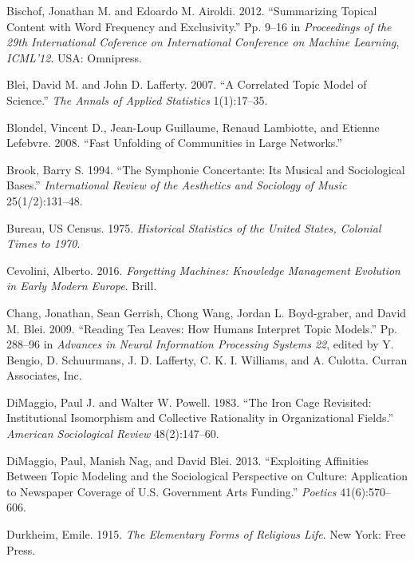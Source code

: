 \documentclass[]{book}
\theoremstyle{definition}
\theoremstyle{definition}
\theoremstyle{definition}
\theoremstyle{remark}
\begin{document}
\leavevmode\hypertarget{ref-Bischof2012Summarizing}{}%
Bischof, Jonathan M. and Edoardo M. Airoldi. 2012. ``Summarizing Topical
Content with Word Frequency and Exclusivity.'' Pp. 9--16 in
\emph{Proceedings of the 29th International Coference on International
Conference on Machine Learning}, \emph{ICML'12}. USA: Omnipress.

\leavevmode\hypertarget{ref-Blei2007correlated}{}%
Blei, David M. and John D. Lafferty. 2007. ``A Correlated Topic Model of
Science.'' \emph{The Annals of Applied Statistics} 1(1):17--35.

\leavevmode\hypertarget{ref-Blondel2008Fast}{}%
Blondel, Vincent D., Jean-Loup Guillaume, Renaud Lambiotte, and Etienne
Lefebvre. 2008. ``Fast Unfolding of Communities in Large Networks.''

\leavevmode\hypertarget{ref-Brook1994Symphonie}{}%
Brook, Barry S. 1994. ``The Symphonie Concertante: Its Musical and
Sociological Bases.'' \emph{International Review of the Aesthetics and
Sociology of Music} 25(1/2):131--48.

\leavevmode\hypertarget{ref-Bureau1975Historical}{}%
Bureau, US Census. 1975. \emph{Historical Statistics of the United
States, Colonial Times to 1970}.

\leavevmode\hypertarget{ref-Cevolini2016Forgetting}{}%
Cevolini, Alberto. 2016. \emph{Forgetting Machines: Knowledge Management
Evolution in Early Modern Europe}. Brill.

\leavevmode\hypertarget{ref-Chang2009Reading}{}%
Chang, Jonathan, Sean Gerrish, Chong Wang, Jordan L. Boyd-graber, and
David M. Blei. 2009. ``Reading Tea Leaves: How Humans Interpret Topic
Models.'' Pp. 288--96 in \emph{Advances in Neural Information Processing
Systems 22}, edited by Y. Bengio, D. Schuurmans, J. D. Lafferty, C. K.
I. Williams, and A. Culotta. Curran Associates, Inc.

\leavevmode\hypertarget{ref-DiMaggio1983Iron}{}%
DiMaggio, Paul J. and Walter W. Powell. 1983. ``The Iron Cage Revisited:
Institutional Isomorphism and Collective Rationality in Organizational
Fields.'' \emph{American Sociological Review} 48(2):147--60.

\leavevmode\hypertarget{ref-DiMaggio2013Exploiting}{}%
DiMaggio, Paul, Manish Nag, and David Blei. 2013. ``Exploiting
Affinities Between Topic Modeling and the Sociological Perspective on
Culture: Application to Newspaper Coverage of U.S. Government Arts
Funding.'' \emph{Poetics} 41(6):570--606.

\leavevmode\hypertarget{ref-Durkheim1915Elementary}{}%
Durkheim, Emile. 1915. \emph{The Elementary Forms of Religious Life}.
New York: Free Press.
\end{document}
